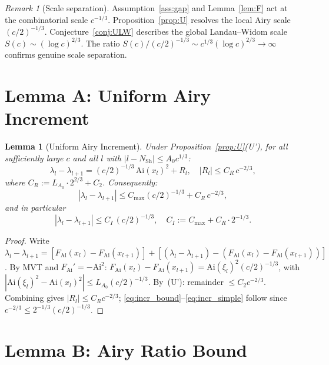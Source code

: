 \documentclass[12pt]{amsart}
\newtheorem{lemma}[theorem]{Lemma}
\theoremstyle{definition}
\theoremstyle{remark}
\newtheorem{remark}[theorem]{Remark}
\newcommand{\FAi}{F_{\mathrm{Ai}}}
\newcommand{\NSh}{N_{\mathrm{Sh}}}
\begin{document}
\begin{remark}[Scale separation]
\label{rem:scales}
Assumption~\ref{ass:gap} and Lemma~\ref{lem:F}
act at the combinatorial scale $c^{-1/3}$.
Proposition~\ref{prop:U} resolves the local Airy
scale $(c/2)^{-1/3}$.
Conjecture~\ref{conj:ULW} describes the global
Landau--Widom scale $S(c) \sim (\log c)^{2/3}$.
The ratio $S(c)/(c/2)^{-1/3}
\sim c^{1/3}(\log c)^{2/3} \to \infty$
confirms genuine scale separation.
\end{remark}

\section{Lemma A: Uniform Airy Increment}
\label{sec:lemmaA}

\begin{lemma}[Uniform Airy Increment]
\label{lem:A}
Under Proposition~\ref{prop:U}\textup{(U')},
for all sufficiently large $c$ and all $l$ with
$|l-\NSh| \le A_0 c^{1/3}$:
\[
  \lambda_l - \lambda_{l+1}
  = (c/2)^{-1/3}\,\mathrm{Ai}(x_l)^2 + R_l,
  \quad |R_l| \le C_R\,c^{-2/3},
\]
where $C_R := L_{A_0}\cdot 2^{2/3} + C_2$.
Consequently:
\begin{equation}\label{eq:incr_bound}
  |\lambda_l-\lambda_{l+1}|
  \le C_{\max}(c/2)^{-1/3} + C_R\,c^{-2/3},
\end{equation}
and in particular
\begin{equation}\label{eq:incr_simple}
  |\lambda_l-\lambda_{l+1}|
  \le C_I\,(c/2)^{-1/3},
  \quad C_I := C_{\max} + C_R\cdot 2^{-1/3}.
\end{equation}
\end{lemma}

\begin{proof}
Write $\lambda_l-\lambda_{l+1}
= [\FAi(x_l)-\FAi(x_{l+1})]
+ [(\lambda_l-\lambda_{l+1})-(\FAi(x_l)-\FAi(x_{l+1}))]$.
By MVT and $\FAi'=-\mathrm{Ai}^2$:
$\FAi(x_l)-\FAi(x_{l+1})
= \mathrm{Ai}(\xi_l)^2(c/2)^{-1/3}$,
with $|\mathrm{Ai}(\xi_l)^2-\mathrm{Ai}(x_l)^2|
\le L_{A_0}(c/2)^{-1/3}$.
By~(U'): remainder $\le C_2 c^{-2/3}$.
Combining gives $|R_l| \le C_R c^{-2/3}$;
\eqref{eq:incr_bound}--\eqref{eq:incr_simple} follow
since $c^{-2/3}\le 2^{-1/3}(c/2)^{-1/3}$.
\end{proof}

\section{Lemma B: Airy Ratio Bound}
\label{sec:lemmaB}
\end{document}
